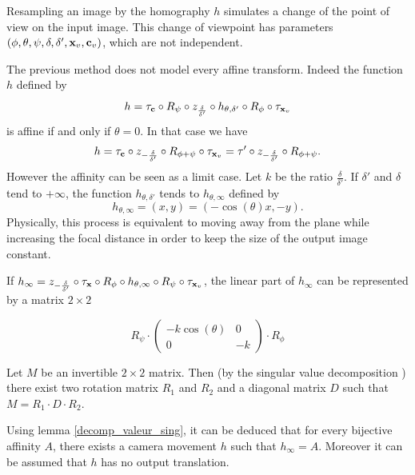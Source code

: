 \begin{remarque}
Resampling an image by the homography $h$ simulates a change of the point of view on the input image. This change of viewpoint has parameters $(\phi,\theta,\psi,\delta,\delta',\mathbf{x}_v,\mathbf{c}_v)$, which are not independent. %
\end{remarque}

\begin{remarque}
The previous method does not model every affine transform. Indeed the function $h$ defined by 
\begin{equation*}
h = \tau_{\mathbf{c}}   \circ R_{\psi} \circ z_{\frac{\delta}{\delta'}} \circ h_{\theta,\delta'} \circ R_{\phi} \circ \tau_{\mathbf{x}_v}
\end{equation*}
is affine if and only if $\theta=0$. In that case we have
\begin{equation*}
h= \tau_{\mathbf{c}} \circ z_{-\frac{\delta}{\delta'}} \circ R_{\phi+\psi} \circ \tau_{\mathbf{x}_{v}}
=\tau' \circ z_{-\frac{\delta}{\delta'}} \circ  R_{\phi+\psi}.
\end{equation*}
However the affinity can be seen as a limit case. Let $k$ be the ratio $\frac{\delta}{\delta'}$. If $\delta'$ and $\delta$ tend to $+\infty$, the function $h_{\theta,\delta'}$ tends to $h_{\theta,\infty}$ defined by
\begin{equation*}
h_{\theta,\infty}=(x,y)=(-\cos(\theta)x,-y).
\end{equation*}
Physically, this process is equivalent to moving away from the plane while increasing the focal distance in order to keep the size of the output image constant.

\noindent If $h_\infty = z_{-\frac{\delta}{\delta'}} \circ \tau_{\mathbf{x}} \circ R_{\phi} \circ h_{\theta,\infty} \circ R_{\psi} \circ \tau_{\mathbf{x}_{v}}$, the linear part of $h_{\infty}$ can be represented by a matrix $2\times2$

\begin{equation*}
R_{\psi} \cdot 
\begin{pmatrix}
-k\cos(\theta)&0\\
0&-k
\end{pmatrix}
\cdot R_{\phi}
\end{equation*}

\begin{lem}
Let $M$ be an invertible $2\times 2$ matrix. Then (by the singular value decomposition \cite{morel2009asift}) there exist two rotation matrix $R_1$ and $R_2$ and a diagonal matrix $D$ such that $M = R_1 \cdot D \cdot R_2$.
\label{decomp_valeur_sing}
\end{lem}

\noindent Using lemma \ref{decomp_valeur_sing}, it can be deduced that for every bijective affinity $A$, there exists a camera movement $h$ such that $h_\infty = A$. Moreover it can be assumed that $h$ has no output translation.
\end{remarque}

